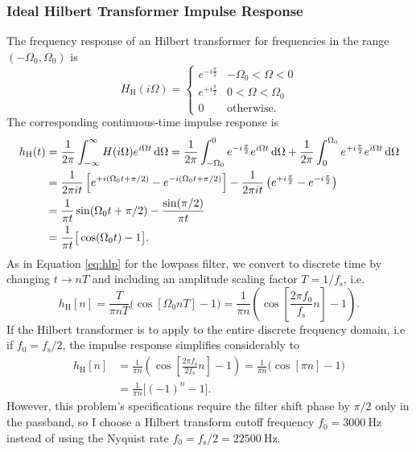 \subsubsection{Ideal Hilbert Transformer Impulse Response}
The frequency response of an Hilbert transformer for frequencies in the range $ (-\Omega_{0}, \Omega_{0}) $ is
\begin{equation*}
    H_{\mathrm{H}} (i\Omega) = 
    \begin{cases}
        e^{- i \frac{\pi}{2}} & -\Omega_{0} < \Omega < 0\\
        e^{+ i \frac{\pi}{2}} & 0 < \Omega < \Omega_{0} \\
        0 & \text{otherwise}.
    \end{cases}
\end{equation*}
The corresponding continuous-time impulse response is
\begin{align*}
    h_{\mathrm{H}}(t) & = \frac{1}{2\pi} \int_{-\infty}^{\infty} H(i \Omega) e^{i \Omega t} \mathop{}\!\mathrm{d} \Omega = \frac{1}{2\pi} \int_{-\Omega_{0}}^{0} e^{-i \frac{\pi}{2}} e^{i \Omega t} \mathop{}\!\mathrm{d} \Omega + \frac{1}{2\pi} \int_{0}^{\Omega_{0}} e^{+i \frac{\pi}{2}} e^{i \Omega t} \mathop{}\!\mathrm{d} \Omega\\
    & = \frac{1}{2\pi i t} \left[ e^{+i (\Omega_{0} t + \pi/2)} - e^{-i (\Omega_{0} t + \pi/2)} \right] - \frac{1}{2\pi i t} \left( e^{+i \frac{\pi}{2}} - e^{-i \frac{\pi}{2}} \right)\\
    & = \frac{1}{\pi t} \sin(\Omega_{0} t + \pi/2) - \frac{\sin(\pi/2)}{\pi t}\\
    & = \frac{1}{\pi t} \big[ \cos (\Omega_{0} t) - 1 \big].
\end{align*}
As in Equation \ref{eq:hlp} for the lowpass filter, we convert to discrete time by changing $ t \to n T $ and including an amplitude scaling factor $ T = 1/f_{\mathrm{s}} $, i.e.
\begin{equation*}
    h_{\mathrm{H}}[n] = \frac{T}{\pi n T} \big( \cos [\Omega_{0} n T] - 1 \big) = \frac{1}{\pi n} \left( \cos \left[ \frac{2\pi f_{0}}{f_{\mathrm{s}}} n\right] - 1 \right).
\end{equation*}
If the Hilbert transformer is to apply to the entire discrete frequency domain, i.e if $ f_{0} = f_{\mathrm{s}}/2 $, the impulse response simplifies considerably to
\begin{align*}
    h_{\mathrm{H}}[n] & = \frac{1}{\pi n} \left( \cos \left[ \frac{2\pi f_{\mathrm{s}}}{2 f_{\mathrm{s}}} n\right] - 1 \right) = \frac{1}{\pi n} \big( \cos [\pi n] - 1 \big)\\
& = \frac{1}{\pi n} \big[ (-1)^{n} - 1 \big].
\end{align*}
However, this problem's specifications require the filter shift phase by $ \pi/2 $ only in the passband, so I choose a Hilbert transform cutoff frequency $ f_{0} = \SI{3000}{\hertz} $ instead of using the Nyquist rate $ f_{0} = f_{\mathrm{s}}/2 = \SI{22500}{\hertz} $.

